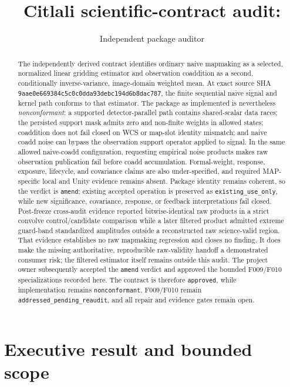 \documentclass[11pt]{article}
\title{\AuditPackageName\\
\large Citlali scientific-contract audit: \AuditPackageID}
\author{Independent package auditor}
\date{\AuditDate}
\newcommand{\code}[1]{\nolinkurl{#1}}
\newcommand{\gitsha}[5]{\texttt{#1\allowbreak#2\allowbreak#3\allowbreak#4\allowbreak#5}}
\newcommand{\AuditGoverningSHA}{\gitsha{9aae0e66}{9384c5c0}{c0dda93d}{ebc194d6}{b8dac787}}
\begin{document}
\maketitle

\begin{abstract}
The independently derived contract identifies ordinary naive mapmaking as a
selected, normalized linear gridding estimator and observation coaddition as a
second, conditionally inverse-variance, image-domain weighted mean.  At exact
source SHA \AuditGoverningSHA, the finite sequential naive signal and
kernel path conforms to that estimator.  The package as implemented is
nevertheless \emph{nonconformant}: a supported detector-parallel path contains
shared-scalar data races; the persisted support mask admits zero and non-finite
weights in allowed states; coaddition does not fail closed on WCS or map-slot
identity mismatch; and naive coadd noise can bypass the observation support
operator applied to signal.  In the same allowed naive-coadd configuration,
requesting empirical noise products makes raw observation publication fail
before coadd accumulation.  Formal-weight, response, exposure, lifecycle, and
covariance claims are also under-specified, and required MAP-specific local and
Unity evidence remains absent.  Package identity remains coherent, so the verdict is
\texttt{amend}; existing accepted operation is preserved as
\code{existing_use_only}, while new significance, covariance, response, or
feedback interpretations fail closed.
Post-freeze cross-audit evidence reported bitwise-identical raw products in a
strict convolve control/candidate comparison while a later filtered product
admitted extreme guard-band standardized amplitudes outside a reconstructed
raw science-valid region.  That evidence establishes no raw mapmaking
regression and closes no finding.  It does make the missing authoritative,
reproducible raw-validity handoff a demonstrated consumer risk; the filtered
estimator itself remains outside this audit.  The project owner subsequently
accepted the \texttt{amend} verdict and approved the bounded F009/F010
specializations recorded here.  The contract is therefore \texttt{approved},
while implementation remains \texttt{nonconformant}, F009/F010 remain
\texttt{addressed\_pending\_reaudit}, and all repair and evidence gates remain
open.
\end{abstract}

\section{Executive result and bounded scope}
\end{document}
